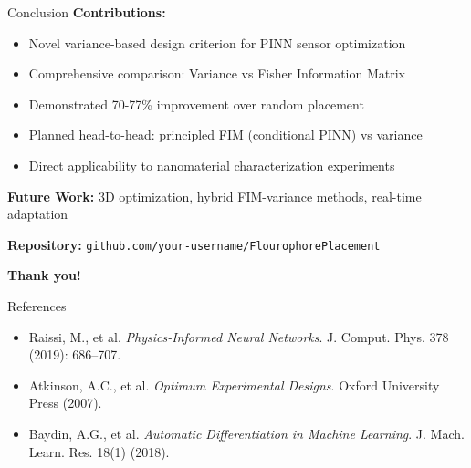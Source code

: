 \documentclass[aspectratio=169]{beamer}
\begin{document}
\begin{frame}{Conclusion}
\textbf{Contributions:}
\begin{itemize}
    \item Novel variance-based design criterion for PINN sensor optimization
    \item Comprehensive comparison: Variance vs Fisher Information Matrix
    \item Demonstrated 70-77\% improvement over random placement
    \item Planned head-to-head: principled FIM (conditional PINN) vs variance
    \item Direct applicability to nanomaterial characterization experiments
\end{itemize}

\vspace{0.3cm}
\textbf{Future Work:} 3D optimization, hybrid FIM-variance methods, real-time adaptation

\vspace{0.3cm}
\centering
\textbf{Repository:} \texttt{github.com/your-username/FlourophorePlacement}

\textbf{Thank you!}
\end{frame}

\begin{frame}{References}
\footnotesize
\begin{itemize}
  \item Raissi, M., et al. \emph{Physics-Informed Neural Networks}. J. Comput. Phys. 378 (2019): 686–707.
  \item Atkinson, A.C., et al. \emph{Optimum Experimental Designs}. Oxford University Press (2007).
  \item Baydin, A.G., et al. \emph{Automatic Differentiation in Machine Learning}. J. Mach. Learn. Res. 18(1) (2018).
\end{itemize}
\end{frame}
\end{document}
